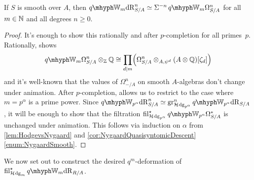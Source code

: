 \documentclass[DIV=12,numbers=enddot,leqno,bibliography=totoc]{scrartcl}
\begin{document}
	\begin{cor}\label{cor:qDRWSmoothAnimation}
		If $S$ is smooth over $A$, then $\qIW_m\deRham_{S/A}^n\simeq \Sigma^{-n}\qIW_m\Omega_{S/A}^n$ for all $m\in\mathbb{N}$ and all degrees $n\geqslant 0$.
	\end{cor}
	\begin{proof}
		It's enough to show this rationally and after $p$-completion for all primes~$p$. Rationally, \cite[Corollary~]{qWitt} shows
		\begin{equation*}
			\qIW_m\Omega_{S/A}^n\otimes_\IZ\IQ\cong \prod_{d\mid m}\left(\Omega_{S/A}^n\otimes_{A,\psi^d}(A\otimes\IQ)[\zeta_d]\right)
		\end{equation*}
		and it's well-known that the values of $\Omega_{-/A}^n$ on smooth $A$-algebras don't change under animation. After $p$-completion, \cite[Lemma~]{qWitt} allows us to restrict to the case where $m=p^\alpha$ is a prime power. Since $\qIW_{p^{\alpha}}\deRham_{S/A}^n\simeq \gr_{\Hhodge_{p^\alpha}}^n\qIW_{p^{\alpha}}\deRham_{S/A}$, it will be enough to show that the filtration $ \fil_{\Hhodge_{p^\alpha}}^\star \qIW_{p^\alpha}\Omega_{S/A}^*$ is unchanged under animation. This follows via induction on $\alpha$ from \cref{lem:HodgevsNygaard} and \cref{cor:NygaardQuasisyntomicDescent}\cref{enum:NygaardSmooth}.
	\end{proof}
	We now set out to construct the desired $q^m$-deformation of $ \fil_{\Hhodge_m}^\star \qIW_m\deRham_{R/A}$.
\end{document}
